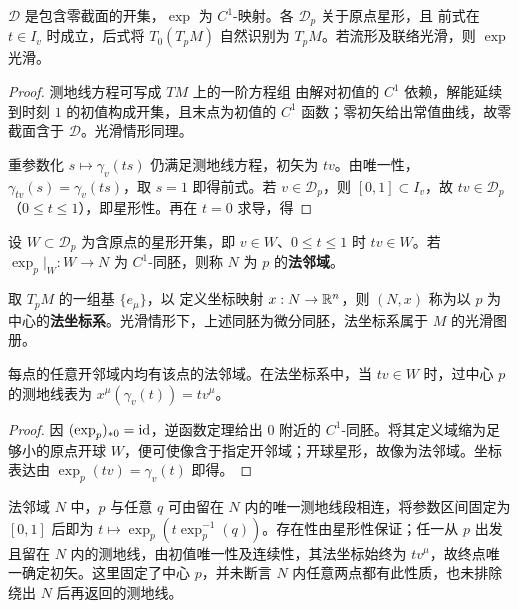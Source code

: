 \begin{theorem}
    $\mathcal D$ 是包含零截面的开集，$\exp$ 为 $C^1$-映射。各 $\mathcal D_p$ 关于原点星形，且
    前式在 $t\in I_v$ 时成立，后式将 $T_0(T_pM)$ 自然识别为 $T_pM$。若流形及联络光滑，则 $\exp$ 光滑。
\end{theorem}
\begin{proof}
    测地线方程可写成 $TM$ 上的一阶方程组
    由解对初值的 $C^1$ 依赖，解能延续到时刻 $1$ 的初值构成开集，且末点为初值的 $C^1$ 函数；零初矢给出常值曲线，故零截面含于 $\mathcal D$。光滑情形同理。

    重参数化 $s\mapsto\gamma_v(ts)$ 仍满足测地线方程，初矢为 $tv$。由唯一性，$\gamma_{tv}(s)=\gamma_v(ts)$，取 $s=1$ 即得前式。若 $v\in\mathcal D_p$，则 $[0,1]\subset I_v$，故 $tv\in\mathcal D_p$（$0\leqslant t\leqslant1$），即星形性。再在 $t=0$ 求导，得
\end{proof}

\begin{definition}
    设 $W\subset\mathcal D_p$ 为含原点的星形开集，即 $v\in W$、$0\leqslant t\leqslant1$ 时 $tv\in W$。若 $\exp_p|_W:W\to N$ 为 $C^1$-同胚，则称 $N$ 为 $p$ 的\textbf{法邻域}。

    取 $T_pM$ 的一组基 $\{e_\mu\}$，以
    定义坐标映射 $x:N\to\mathbb{R}^n$，则 $(N,x)$ 称为以 $p$ 为中心的\textbf{法坐标系}。光滑情形下，上述同胚为微分同胚，法坐标系属于 $M$ 的光滑图册。
\end{definition}

\begin{theorem}
    每点的任意开邻域内均有该点的法邻域。在法坐标系中，当 $tv\in W$ 时，过中心 $p$ 的测地线表为 $x^\mu(\gamma_v(t))=tv^\mu$。
\end{theorem}
\begin{proof}
    因 $(\exp_p)_{*0}=\mathrm{id}$，逆函数定理给出 $0$ 附近的 $C^1$-同胚。将其定义域缩为足够小的原点开球 $W$，便可使像含于指定开邻域；开球星形，故像为法邻域。坐标表达由 $\exp_p(tv)=\gamma_v(t)$ 即得。
\end{proof}

\begin{remark}
    法邻域 $N$ 中，$p$ 与任意 $q$ 可由留在 $N$ 内的唯一测地线段相连，将参数区间固定为 $[0,1]$ 后即为 $t\mapsto\exp_p(t\exp_p^{-1}(q))$。存在性由星形性保证；任一从 $p$ 出发且留在 $N$ 内的测地线，由初值唯一性及连续性，其法坐标始终为 $tv^\mu$，故终点唯一确定初矢。这里固定了中心 $p$，并未断言 $N$ 内任意两点都有此性质，也未排除绕出 $N$ 后再返回的测地线。
\end{remark}

